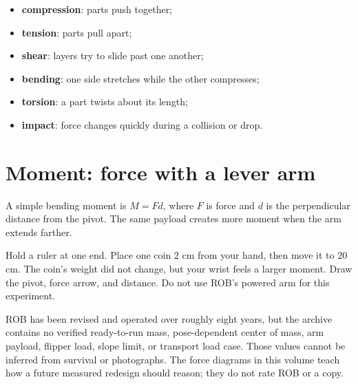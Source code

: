 \documentclass[11pt,openany]{book}
\begin{document}
\begin{itemize}
  \item \textbf{compression}: parts push together;
  \item \textbf{tension}: parts pull apart;
  \item \textbf{shear}: layers try to slide past one another;
  \item \textbf{bending}: one side stretches while the other compresses;
  \item \textbf{torsion}: a part twists about its length;
  \item \textbf{impact}: force changes quickly during a collision or drop.
\end{itemize}


\section*{Moment: force with a lever arm}

A simple bending moment is $M = Fd$, where $F$ is force and $d$ is the perpendicular distance from the pivot. The same payload creates more moment when the arm extends farther.

\begin{buildbox}[title={RULER LEVER TEST}]
Hold a ruler at one end. Place one coin 2 cm from your hand, then move it to 20 cm. The coin's weight did not change, but your wrist feels a larger moment. Draw the pivot, force arrow, and distance. Do not use ROB's powered arm for this experiment.
\end{buildbox}

\begin{fieldnotebox}[title={EIGHT YEARS OF USE IS NOT A LOAD CASE}]
ROB has been revised and operated over roughly eight years, but the archive contains no verified ready-to-run mass, pose-dependent center of mass, arm payload, flipper load, slope limit, or transport load case. Those values cannot be inferred from survival or photographs. The force diagrams in this volume teach how a future measured redesign should reason; they do not rate ROB or a copy.
\end{fieldnotebox}

\end{document}
